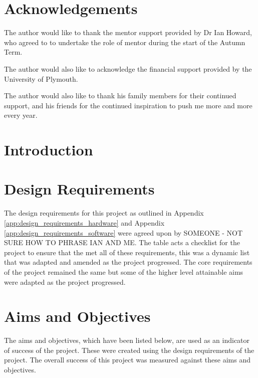 \documentclass [11pt]{article}
\begin{document}
\newpage
\section*{Acknowledgements}

The author would like to thank the mentor support provided by Dr Ian Howard, who agreed to to undertake the role of mentor during the start of the Autumn Term.

The author would also like to acknowledge the financial support provided by the University of Plymouth. 

The author would also like to thank his family members for their continued support, and his friends for the continued inspiration to push me more and more every year.


		
\newpage			
{}
\setcounter{page}{1}
\tableofcontents 
\newpage

\listoffigures
\listoftables
\lstlistoflistings
\printglossaries

\newpage
\section{Introduction}



\section{Design Requirements}

The design requirements for this project as outlined in Appendix \ref{app:design_requirements_hardware} and Appendix \ref{app:design_requirements_software} were agreed upon by {SOMEONE - NOT SURE HOW TO PHRASE IAN AND ME}. The table acts a checklist for the project to ensure that the met all of these requirements, this was a dynamic list that was adapted and amended as the project progressed. The core requirements of the project remained the same but some of the higher level attainable aims were adapted as the project progressed. 

\section{Aims and Objectives}

The aims and objectives, which have been listed below, are used as an indicator of success of the project. These were created using the design requirements of the project. The overall success of this project was measured against these aims and objectives. 
\end{document}
